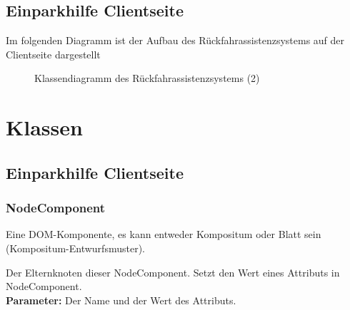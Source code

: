 \documentclass[entwurf.tex]{subfiles}
\begin{document}
  	\newpage
  	\section{Einparkhilfe Clientseite}
		Im folgenden Diagramm ist der Aufbau des Rückfahrassistenzsystems auf der Clientseite dargestellt
		\begin{figure}[H]
  			\caption{Klassendiagramm des Rückfahrassistenzsystems (2)}
  		\end{figure}
  	
  	
\chapter{Klassen}
		\section{Einparkhilfe Clientseite}
	\subsection{NodeComponent}
	\label{Abstract Class:NodeComponent}
		Eine DOM-Komponente, es kann entweder Kompositum oder Blatt sein (Kompositum-Entwurfsmuster).
		\begin{description}
				Der Elternknoten dieser NodeComponent.
				Setzt den Wert eines Attributs in NodeComponent.\\
				\textbf{Parameter:} Der Name und der Wert des Attributs.\\
		\end{description}
		
\end{document}
